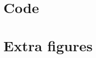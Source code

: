 \documentclass[a4paper, 12pt]{article}
\begin{document}

\clearpage
\appendix

\section{Code}
% 

\section{Extra figures}
\end{document}

